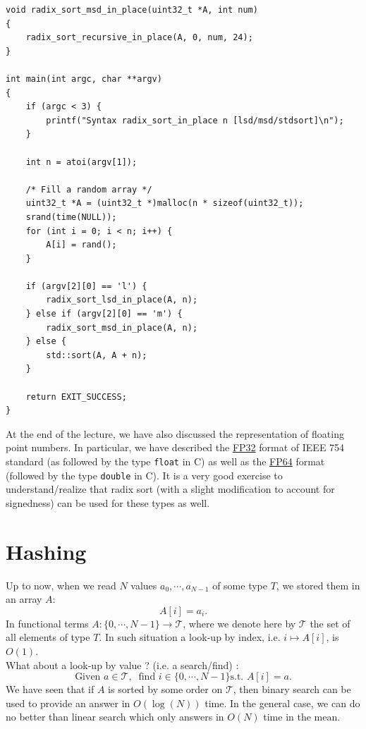 \documentclass[12pt]{article}
\theoremstyle{plain}
\theoremstyle{remark}
\begin{document}
\begin{lstlisting}[style=C]
void radix_sort_msd_in_place(uint32_t *A, int num)
{
	radix_sort_recursive_in_place(A, 0, num, 24);
}

int main(int argc, char **argv)
{
	if (argc < 3) {
		printf("Syntax radix_sort_in_place n [lsd/msd/stdsort]\n");
	}

	int n = atoi(argv[1]);

	/* Fill a random array */
	uint32_t *A = (uint32_t *)malloc(n * sizeof(uint32_t));
	srand(time(NULL));
	for (int i = 0; i < n; i++) {
		A[i] = rand();
	}

	if (argv[2][0] == 'l') {
		radix_sort_lsd_in_place(A, n);
	} else if (argv[2][0] == 'm') {
		radix_sort_msd_in_place(A, n);
	} else {
		std::sort(A, A + n);
	}

	return EXIT_SUCCESS;
}
\end{lstlisting}

At the end of the lecture, we have also discussed the representation of floating
point numbers. In particular, we have described the 
\href{https://en.wikipedia.org/wiki/Single-precision_floating-point_format}{FP32}
format of IEEE 754 standard (as followed by the type {\tt float} in C) as well
as the
\href{https://en.wikipedia.org/wiki/Double-precision_floating-point_format}{FP64}
format (followed by the type {\tt double} in C). It is a very good exercise to
understand/realize that radix sort (with a slight modification to account for signedness) 
can be used for these types as well.


\pagebreak
\section{Hashing}\label{sec:hash}

Up to now, when we read $N$ values $a_0, \cdots, a_{N-1}$ of some type $T$, we
stored them in an array $A$:
$$
A[i] = a_i.
$$
In functional terms $A: \{0,\cdots, N-1\} \to \mathcal{T}$, where we denote here
by $\mathcal{T}$ the set of all elements of type $T.$ In such situation a 
look-up by index, i.e. $i \mapsto A[i]$, is $O(1)$.\\
What about a look-up by value ? (i.e. a
search/find) : 
$$
\text{Given } a \in \mathcal{T}, \ \text{ find } i \in \{0,\cdots,N-1\} \text{
	s.t. } A[i] = a.
$$
We have seen that if $A$ is sorted by some order on $\mathcal{T}$, then binary
search can be used to provide an answer in $O(\log(N))$ time. In the general
case, we can do no better than linear search which only answers in $O(N)$ time
in the mean.
\end{document}
